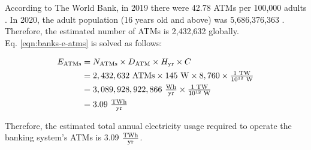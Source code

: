 According to The World Bank, in 2019 there were 42.78 ATMs per 100,000 adults \cite{number-branches-atms}.
In 2020, the adult population (16 years old and above) was 5,686,376,363 \cite{pop}.
Therefore, the estimated number of ATMs is 2,432,632 globally. \\

Eq. \eqref{eqn:banks-e-atms} is solved as follows:

\begin{align}\label{eqn:banks-e-atm-res}
                    E_\textrm{ATMs} &= N_\textrm{ATMs} \times D_\textrm{ATM} \times H_\textrm{yr} \times C \nonumber \\
                    &= 2,432,632 \textrm{ ATMs} \times 145 \textrm{ W}  \times 8,760 \times \tfrac{1 \textrm{ TW} } { 10^{12} \textrm{ W}} \nonumber \\
                    &= 3,089,928,922,866 \ \tfrac{ \textrm{{}Wh} } { \textrm{yr} } \times \tfrac{1 \textrm{ TW} } { 10^{12} \textrm{ W}} \nonumber \\
                    &= 3.09 \ \tfrac{ \textrm{{T}Wh} } { \textrm{yr} } 
\end{align}

Therefore, the estimated total annual electricity usage required to operate the banking system's ATMs is 3.09 $\tfrac{ \textrm{{T}Wh} } { \textrm{yr} }$.
